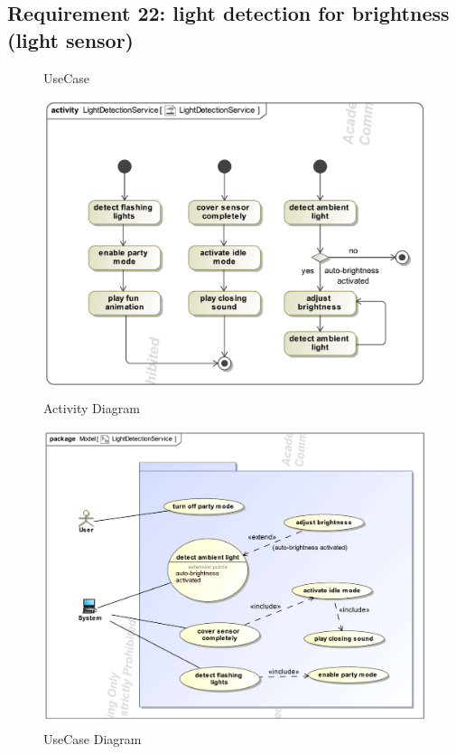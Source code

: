 \documentclass{article}
\begin{document}
	\subsection{Requirement 22: light detection for brightness (light sensor)}
		\begin{figure}[h!]
			\centering
			\captionsetup{labelformat=empty}
			\caption{UseCase}
		\end{figure}
		\clearpage
		\begin{figure}[h!]
		    	\centering
		   	\captionsetup{labelformat=empty}
		   	\caption{Activity Diagram}
		    	\includegraphics[width=\textwidth, angle=0]{Marc/light/LightDetectionServiceActivity.pdf}
		\end{figure}
		\clearpage
		\begin{figure}[h!]
			\centering
			\captionsetup{labelformat=empty}
			\caption{UseCase Diagram}
		    	\includegraphics[width=\textwidth, angle=0]{Marc/light/LightDetectionServiceUseCase.pdf}
		\end{figure}
\end{document}
